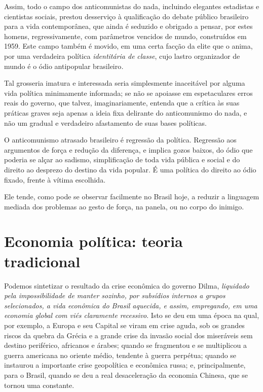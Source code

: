Assim, todo o campo dos anticomunistas do nada, incluindo elegantes
estadistas e cientistas sociais, prestou desserviço à qualificação do
debate público brasileiro para a vida contemporânea, que ainda é
seduzido e obrigado a pensar, por estes homens, regressivamente, com
parâmetros vencidos de mundo, construídos em 1959. Este campo também é
movido, em uma certa facção da elite que o anima, por uma verdadeira
política \emph{identitária de} \emph{classe}, cujo lastro organizador de
mundo é o ódio antipopular brasileiro\emph{. }

Tal grosseria imatura e interessada seria simplesmente inaceitável por
alguma vida política minimamente informada; se não se apoiasse em
espetaculares erros reais do governo, que talvez, imaginariamente,
entenda que a crítica às suas práticas graves seja apenas a ideia fixa
delirante do anticomunismo do nada, e não um gradual e verdadeiro
afastamento de suas bases políticas.

O anticomunismo atrasado brasileiro é regressão da política. Regressão
aos argumentos de força e redução da diferença, e implica gozos baixos,
do ódio que poderia se alçar ao sadismo, simplificação de toda vida
pública e social e do direito ao desprezo do destino da vida
popular. É uma política do direito ao ódio fixado, frente à vítima
escolhida.

Ele tende, como pode se observar facilmente no Brasil hoje, a reduzir a
linguagem mediada dos problemas ao gesto de força, na panela, ou no
corpo do inimigo.

  \section{Economia política: teoria
  tradicional}\label{economia-poluxedtica-teoria-tradicional}

Podemos sintetizar o resultado da crise econômica do governo Dilma, 
\emph{liquidado pela impossibilidade de manter sozinho, por subsídios internos a grupos
selecionados, a vida econômica do Brasil aquecida, e assim, empregando, em uma
economia global com viés claramente recessivo}. Isto se deu em uma época na qual,
por exemplo, a Europa e seu Capital se viram em crise aguda, sob os grandes
riscos da quebra da Grécia e a grande crise da invasão social dos miseráveis sem
destino periférico, africanos e árabes; quando se fragmentou e se multiplicou a
guerra americana no oriente médio, tendente à guerra perpétua; quando se
instaurou a importante crise geopolítica e econômica russa; e, principalmente,
para o Brasil, quando se deu a real desaceleração da economia Chinesa, que se
tornou uma constante. 

